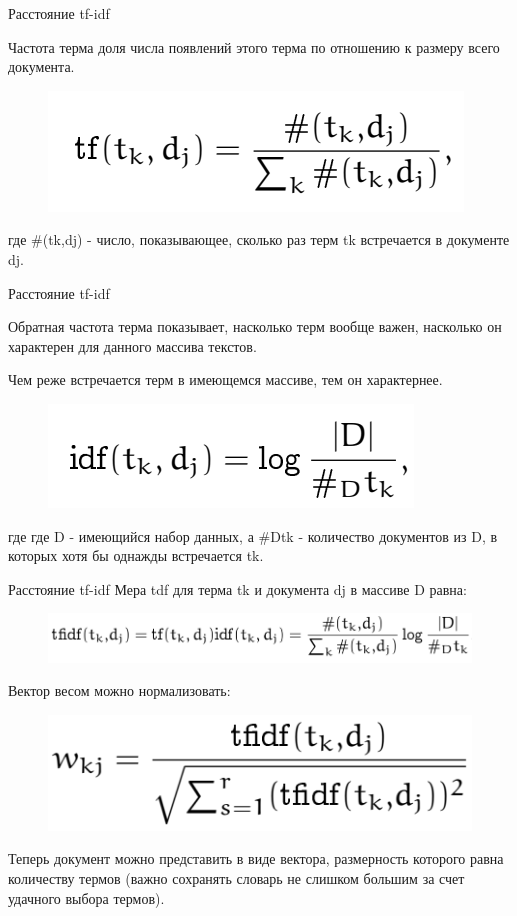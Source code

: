 \documentclass{beamer}
\begin{document}
\begin{frame}{Расстояние tf-idf}
\begin{block}{Частота терма}
доля числа появлений этого терма по отношению к размеру всего документа.
\end{block}
\begin{figure}[h]
\centering
\includegraphics[scale=0.4]{images/lec07-pic10.png}
\end{figure}
где \#(tk,dj) - число, показывающее, сколько раз терм tk встречается в документе dj.
\end{frame}

\begin{frame}{Расстояние tf-idf}
\begin{block}{Обратная частота терма}
показывает, насколько терм вообще важен, насколько он характерен для данного массива текстов.
\end{block}
Чем реже встречается терм в имеющемся массиве, тем он характернее.
\begin{figure}[h]
\centering
\includegraphics[scale=0.4]{images/lec07-pic11.png}
\end{figure}
где где D - имеющийся набор данных, а \#Dtk - количество документов из D, в которых хотя бы однажды встречается tk.
\end{frame}

\begin{frame}{Расстояние tf-idf}
Мера tdf для терма tk и документа dj в массиве D равна:
\begin{figure}[h]
\centering
\includegraphics[scale=0.4]{images/lec07-pic12.png}
\end{figure}
Вектор весом можно нормализовать:
\begin{figure}[h]
\centering
\includegraphics[scale=0.4]{images/lec07-pic13.png}
\end{figure}
Теперь документ можно представить в виде вектора, размерность которого равна количеству термов (важно сохранять словарь не слишком большим за счет удачного выбора термов).
\end{frame}
\end{document}
